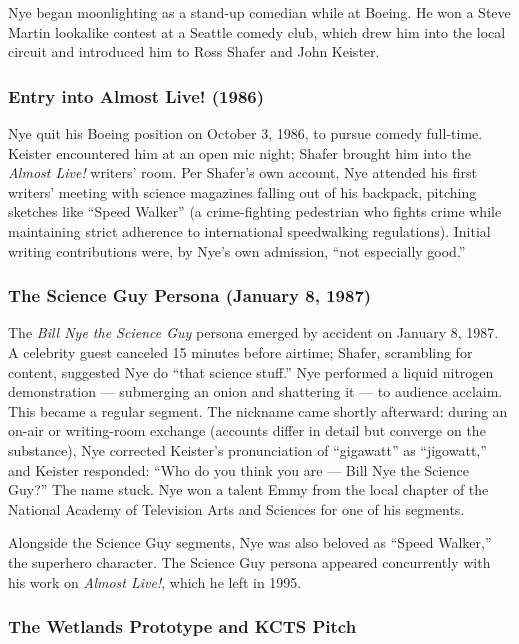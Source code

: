 \documentclass[11pt,letterpaper]{article}
\begin{document}
Nye began moonlighting as a stand-up comedian while at Boeing. He won a Steve Martin lookalike contest at a Seattle comedy club, which drew him into the local circuit and introduced him to Ross Shafer and John Keister.

\subsubsection{Entry into Almost Live! (1986)}

Nye quit his Boeing position on October 3, 1986, to pursue comedy full-time. Keister encountered him at an open mic night; Shafer brought him into the \textit{Almost Live!} writers' room. Per Shafer's own account, Nye attended his first writers' meeting with science magazines falling out of his backpack, pitching sketches like ``Speed Walker'' (a crime-fighting pedestrian who fights crime while maintaining strict adherence to international speedwalking regulations). Initial writing contributions were, by Nye's own admission, ``not especially good.''

\subsubsection{The Science Guy Persona (January 8, 1987)}

The \textit{Bill Nye the Science Guy} persona emerged by accident on January 8, 1987. A celebrity guest canceled 15 minutes before airtime; Shafer, scrambling for content, suggested Nye do ``that science stuff.'' Nye performed a liquid nitrogen demonstration --- submerging an onion and shattering it --- to audience acclaim. This became a regular segment. The nickname came shortly afterward: during an on-air or writing-room exchange (accounts differ in detail but converge on the substance), Nye corrected Keister's pronunciation of ``gigawatt'' as ``jigowatt,'' and Keister responded: ``Who do you think you are --- Bill Nye the Science Guy?'' The name stuck. Nye won a talent Emmy from the local chapter of the National Academy of Television Arts and Sciences for one of his segments.

Alongside the Science Guy segments, Nye was also beloved as ``Speed Walker,'' the superhero character. The Science Guy persona appeared concurrently with his work on \textit{Almost Live!}, which he left in 1995.

\subsubsection{The Wetlands Prototype and KCTS Pitch}
\end{document}
